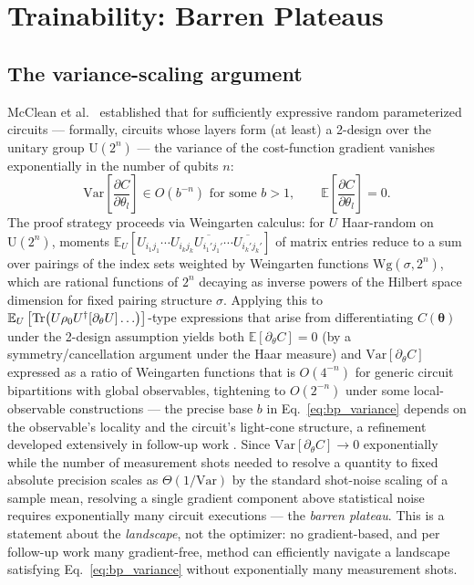 \documentclass[11pt]{article}
\begin{document}
\section{Trainability: Barren Plateaus}
\label{sec:barren}

\subsection{The variance-scaling argument}
McClean et al.\ \cite{McClean2018} established that for sufficiently expressive random parameterized circuits — formally, circuits whose layers form (at least) a 2-design over the unitary group $\mathrm{U}(2^n)$ — the variance of the cost-function gradient vanishes exponentially in the number of qubits $n$:
\begin{equation}
\mathrm{Var}\left[\frac{\partial C}{\partial\theta_l}\right] \in O\!\left(b^{-n}\right) \text{ for some } b>1, \qquad \mathbb{E}\left[\frac{\partial C}{\partial\theta_l}\right] = 0.
\label{eq:bp_variance}
\end{equation}
The proof strategy proceeds via Weingarten calculus: for $U$ Haar-random on $\mathrm{U}(2^n)$, moments $\mathbb{E}_U\left[U_{i_1 j_1}\cdots U_{i_k j_k}\overline{U_{i_1' j_1'}}\cdots\overline{U_{i_k' j_k'}}\right]$ of matrix entries reduce to a sum over pairings of the index sets weighted by Weingarten functions $\mathrm{Wg}(\sigma,2^n)$, which are rational functions of $2^n$ decaying as inverse powers of the Hilbert space dimension for fixed pairing structure $\sigma$. Applying this to $\mathbb{E}_U\left[\Tr(U\rho_0 U^\dagger [\partial_\theta U] \ldots)\right]$-type expressions that arise from differentiating $C(\bm{\theta})$ under the 2-design assumption yields both $\mathbb{E}[\partial_\theta C]=0$ (by a symmetry/cancellation argument under the Haar measure) and $\mathrm{Var}[\partial_\theta C]$ expressed as a ratio of Weingarten functions that is $O(4^{-n})$ for generic circuit bipartitions with global observables, tightening to $O(2^{-n})$ under some local-observable constructions — the precise base $b$ in Eq.~\eqref{eq:bp_variance} depends on the observable's locality and the circuit's light-cone structure, a refinement developed extensively in follow-up work \cite{Larocca2025}. Since $\mathrm{Var}[\partial_\theta C]\to 0$ exponentially while the number of measurement shots needed to resolve a quantity to fixed absolute precision scales as $\Theta(1/\mathrm{Var})$ by the standard shot-noise scaling of a sample mean, resolving a single gradient component above statistical noise requires exponentially many circuit executions — the \emph{barren plateau}. This is a statement about the \emph{landscape}, not the optimizer: no gradient-based, and per follow-up work many gradient-free, method can efficiently navigate a landscape satisfying Eq.~\eqref{eq:bp_variance} without exponentially many measurement shots.
\end{document}
